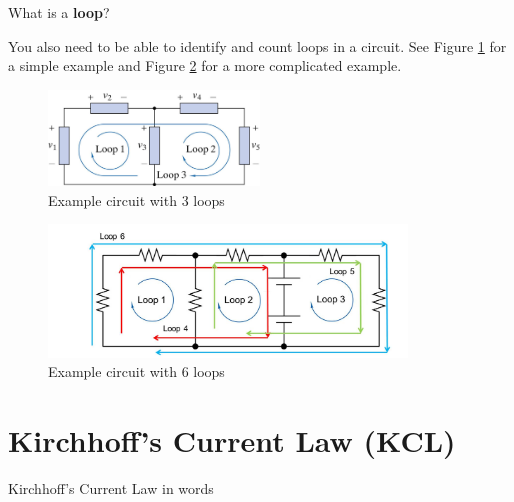 \documentclass{handout}
\begin{document}
What is a \textbf{loop}?


You also need to be able to identify and count loops in a circuit. See  Figure \ref{fig: SimpleLoopCounting} for a simple example and Figure \ref{fig: ComplicatedLoopCounting} for a more complicated example.

\begin{figure}[h b t]
\centering
\includegraphics[width=0.5\textwidth]{SimpleLoopCounting.jpg}
\caption{Example circuit with 3 loops}
\label{fig: SimpleLoopCounting}
\end{figure}

\begin{figure}[h b t]
\centering

\includegraphics[width=0.85\textwidth]{ComplicatedLoopCounting.jpg}
\caption{Example circuit with 6 loops}
\label{fig: ComplicatedLoopCounting}
\end{figure}

\newpage

\section{Kirchhoff's Current Law (KCL)}
Kirchhoff's Current Law in words

\end{document}
